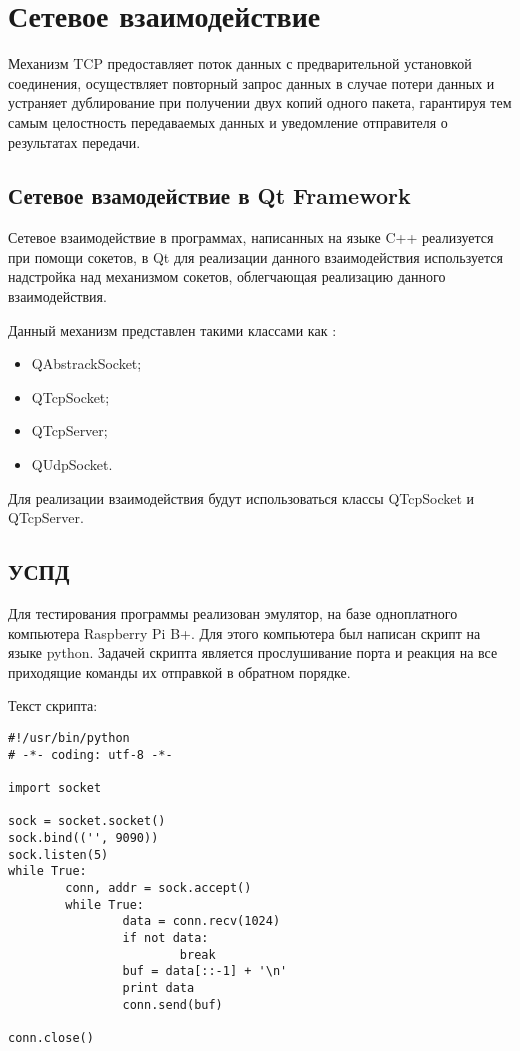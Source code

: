 \section{Сетевое взаимодействие}

Механизм TCP предоставляет поток данных с предварительной установкой соединения, осуществляет повторный запрос данных в случае потери данных и устраняет дублирование при получении двух копий одного пакета, гарантируя тем самым целостность передаваемых данных и уведомление отправителя о результатах передачи.

\subsection{Сетевое взамодействие в Qt Framework}

Сетевое взаимодействие в программах, написанных на языке C++ реализуется при помощи сокетов, в Qt для реализации данного взаимодействия используется надстройка над механизмом сокетов, облегчающая реализацию данного взаимодействия.

Данный механизм представлен такими классами как \cite{qt_net}:
\begin{itemize}
 \item QAbstrackSocket;
 \item QTcpSocket;
 \item QTcpServer;
 \item QUdpSocket.
\end{itemize}

Для реализации взаимодействия будут использоваться классы QTcpSocket и QTcpServer.

\subsection{УСПД}

Для тестирования программы реализован эмулятор, на базе одноплатного компьютера Raspberry Pi B+. Для этого компьютера был написан скрипт на языке python. Задачей скрипта является прослушивание порта и реакция на все приходящие команды их отправкой в обратном порядке. 

Текст скрипта:

\begin{lstlisting}
#!/usr/bin/python
# -*- coding: utf-8 -*-

import socket

sock = socket.socket()
sock.bind(('', 9090))
sock.listen(5)
while True:
        conn, addr = sock.accept()
        while True:
                data = conn.recv(1024)
                if not data:
                        break
                buf = data[::-1] + '\n'
                print data
                conn.send(buf)

conn.close()
\end{lstlisting}

